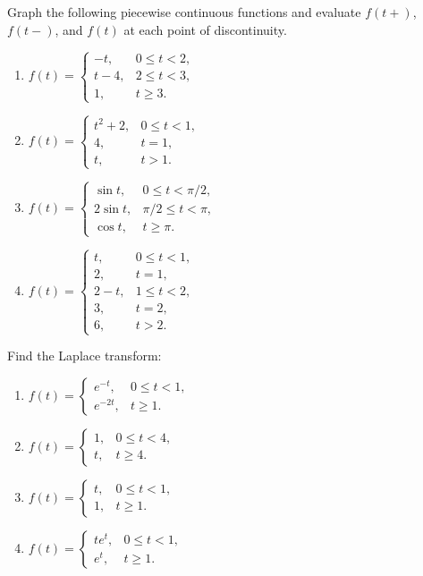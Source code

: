\documentclass{ximera}
\begin{document}
\begin{problem}\label{exer:8.1.4}
 Graph the following piecewise continuous functions and evaluate
$f(t+)$, $f(t-)$, and $f(t)$ at each point of discontinuity.

\begin{enumerate}
    \item $f(t)=\left\{\begin{array}{cl} -t,
& 0\le t<2,\\ t-4, & 2\le t<3,\\ 1, & t\ge
3.\end{array}\right.$
    \item $f(t)=\left\{\begin{array}{cl} t^2+2, & 0
\le t<1,\\4, & t=1,\\ t, & t>
1.\end{array}\right.$
    \item $f(t)=\left\{\begin{array}{rl}
\sin t, & 0\le t<\pi/ 2,\\ 2\sin t, &\pi/ 2
\le t<\pi,\\ \cos t, & t\ge\pi.\end{array}\right.$
    \item $f(t)=\left\{\begin{array}{cl}t,
 & 0\le t<1,\\ 2, & t=1,\\ 2-t, & 1
\le t<2,\\ 3, & t=2,\\ 6, & t>
2.\end{array}\right.$
\end{enumerate}
\end{problem}

\begin{problem}\label{exer:8.1.5}
 Find the Laplace transform:

\begin{enumerate}
    \item $f(t)=\left\{\begin{array}{rl} e^{-t}, &
0\le t<1,\\ e^{-2t}, & t\ge 1.\end{array}\right.$ 
    \item $f(t)=\left\{\begin{array}{rl} 1, & 0\le t<
4,\\ t, & t\ge 4.\end{array}\right.$
    \item $f(t)=\left\{\begin{array}{rl} t, & 0\le
t<1,\\ 1, & t\ge 1.\end{array}\right.$
    \item $f(t)=\left\{\begin{array}{rl} te^t, & 0\le
t<1,\\ e^t, & t\ge 1.\end{array}\right.$
\end{enumerate}
\end{problem}
\end{document}
